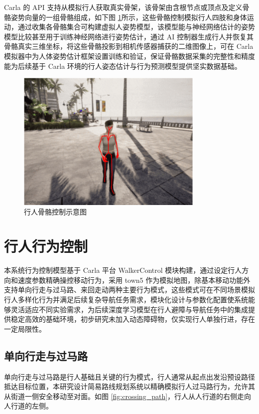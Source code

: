 Carla 的 API 支持从模拟行人获取真实骨架，该骨架由含根节点或顶点及定义骨骼姿势向量的一组骨骼组成\cite{openhutb2025}，如下图 \ref{fig:pedestrian_skeleton}所示，这些骨骼控制模拟行人四肢和身体运动，通过收集各骨骼集合可构建虚拟人姿势模型，该模型能与神经网络估计的姿势模型比较甚至用于训练神经网络进行姿势估计，通过 AI 控制器生成行人并恢复其骨骼真实三维坐标，将这些骨骼投影到相机传感器捕获的二维图像上，可在 Carla 模拟器中为人体姿势估计框架设置训练和验证，保证骨骼数据采集的完整性和精度能为后续基于 Carla 环境的行人姿态估计与行为预测模型提供坚实数据基础。

\begin{figure}[H]
    \centering
    \includegraphics[width=0.8\textwidth]{images/pedestrian_skeleton.pdf}
    \caption{行人骨骼控制示意图}
    \label{fig:pedestrian_skeleton}
\end{figure}

\section{行人行为控制}
本系统行为控制模型基于 Carla 平台 WalkerControl 模块构建，通过设定行人方向和速度参数精确操控移动行为，采用 town5 作为模拟地图，除基本移动功能外支持单向行走与过马路、来回走动两种主要行为模式，这些模式可在不同场景模拟行人多样化行为并满足后续复杂导航任务需求，模块化设计与参数化配置使系统能够灵活适应不同实验需求，为后续深度学习模型在行人避障与导航任务中的集成提供稳定高效的基础环境，初步研究未加入动态障碍物，仅实现行人单独行进，存在一定局限性。\cite{csdn2023carla}

\subsection{单向行走与过马路}
单向行走与过马路是行人基础且关键的行为模式，行人通常从起点出发沿预设路径抵达目标位置，本研究设计简易路线规划系统以精确模拟行人过马路行为，允许其从街道一侧安全移动至对面。如图 \ref{fig:crossing_path}，行人从人行道的右侧走向人行道的左侧。

